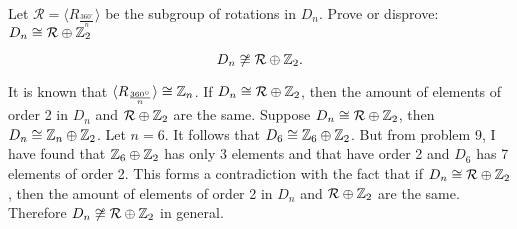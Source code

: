 \documentclass[titlepage]{article}
\begin{document}
\begin{problem}{11}
Let $\mathcal{R} = \langle R_{\frac{360^{\circ}}{n}} \rangle$ be the subgroup of rotations in $D_n$. Prove or disprove: $D_n \cong \mathcal{R} \oplus \mathbb{Z}_2$
\end{problem}
$$ D_n \not \cong \mathcal{R} \oplus \mathbb{Z}_2.$$
\begin{myproof}
It is known that $\langle R_{\frac{360^{\circ}}{n}}\rangle \cong \mathbb{Z}_{n}$. If $D_n \cong \mathcal{R} \oplus \mathbb{Z}_2$, then the amount of elements of order 2 in $D_n$ and $\mathcal{R} \oplus \mathbb{Z}_2$ are the same. Suppose $D_n \cong \mathcal{R} \oplus \mathbb{Z}_2$, then $D_n \cong \mathbb{Z}_n \oplus \mathbb{Z}_2$. Let $n=6$. It follows that $D_6 \cong \mathbb{Z}_6 \oplus \mathbb{Z}_2$. But from problem 9, I have found that $\mathbb{Z}_6 \oplus \mathbb{Z}_2$ has only 3 elements and that have order 2 and $D_6$ has 7 elements of order 2. This forms a contradiction with the fact that if $D_n \cong \mathcal{R} \oplus \mathbb{Z}_2$, then the amount of elements of order 2 in $D_n$ and $\mathcal{R} \oplus \mathbb{Z}_2$ are the same. Therefore $D_n \not \cong \mathcal{R} \oplus \mathbb{Z}_2$ in general.
\end{myproof}
\end{document}
